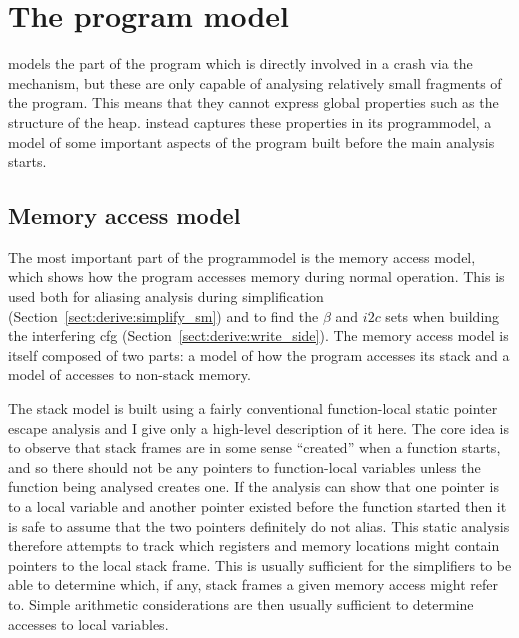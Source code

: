 {\section{The program model}
\label{sect:program_model}

{\Technique} models the part of the program which is directly involved
in a crash via the {\StateMachine} mechanism, but these are only
capable of analysing relatively small fragments of the program.  This
means that they cannot express global properties such as the structure
of the heap.  {\Technique} instead captures these properties in its
\gls{programmodel}, a model of some important aspects of the program
built before the main analysis starts.


\subsection{Memory access model}
\label{sect:program_model:dynamic_alias}

The most important part of the \gls{programmodel} is the memory access
model, which shows how the program accesses memory during normal
operation.  This is used both for aliasing analysis during
{\StateMachine} simplification (Section~\ref{sect:derive:simplify_sm})
and to find the $\beta$ and $i2c$ sets when building the interfering
\gls{cfg} (Section~\ref{sect:derive:write_side}).  The memory access
model is itself composed of two parts: a model of how the program
accesses its stack and a model of accesses to non-stack memory.

The stack model is built using a fairly conventional function-local
static pointer escape analysis\needCite{} and I give only a high-level
description of it here.  The core idea is to observe that stack frames
are in some sense ``created'' when a function starts, and so there
should not be any pointers to function-local variables unless the
function being analysed creates one.  If the analysis can show that
one pointer is to a local variable and another pointer existed before
the function started then it is safe to assume that the two pointers
definitely do not alias.  This static analysis therefore attempts to
track which registers and memory locations might contain pointers to
the local stack frame.  This is usually sufficient for the
{\StateMachine} simplifiers to be able to determine which, if any,
stack frames a given memory access might refer to.  Simple arithmetic
considerations are then usually sufficient to determine accesses to
local variables.

}
